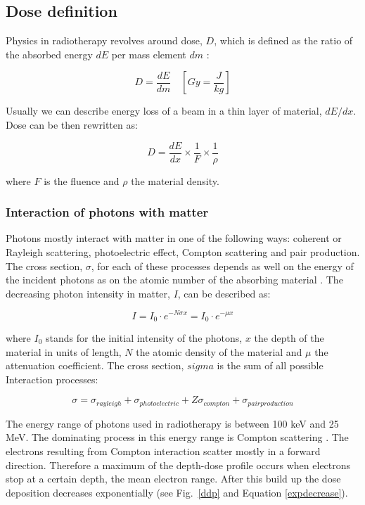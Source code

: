\documentclass[type=dr, dr=rernat, accentcolor=tud7b,colorbacktitle, bigchapter, openright, twoside, 12pt ]{tudthesis}
\begin{document}
\subsection{Dose definition}

Physics in radiotherapy revolves around dose, $D$, which is defined as the ratio of the absorbed energy $dE$ per mass element $dm$ \cite{ICRU1993}:

\begin{equation}
 D = \frac{dE}{dm} \quad \left[ Gy = \frac{J}{kg} \right]
\end{equation}

Usually we can describe energy loss of a beam in a thin layer of material, $dE/dx$. Dose can be then rewritten as:

\begin{equation}
 D = \frac{dE}{dx} \times \frac{1}{F} \times \frac{1}{\rho}
\end{equation}

where $F$ is the fluence and $\rho$ the material density.


\subsubsection{Interaction of photons with matter}

Photons mostly interact with matter in one of the following ways: coherent or Rayleigh scattering, photoelectric effect, Compton scattering and pair production. The cross section, $\sigma$, for each of these processes depends as well on the energy of the incident photons as on the atomic number of the absorbing material \cite{Lilley2006}. The decreasing photon intensity in matter, $I$, can be described as:

\begin{equation}
 I = I_{0} \cdot e^{- N \sigma x} = I_{0} \cdot e^{-\mu x}
 \label{expdecrease}
\end{equation} 

where $I_{0}$ stands for the initial intensity of the photons, $x$ the depth of the material in units of length, $N$ the atomic density of the material and $\mu$ the attenuation coefficient. The cross section, $sigma$ is the sum of all possible Interaction processes:

\begin{equation}
{\sigma} = \sigma_{rayleigh} + \sigma_{photoelectric} + Z\sigma_{compton} + \sigma_{pairproduction} 
\end{equation}

The energy range of photons used in radiotherapy is between 100 keV and 25 MeV. The dominating process in this energy range is Compton scattering \cite{Alpen1998}.
The electrons resulting from Compton interaction scatter mostly in a forward direction. Therefore a maximum of the depth-dose profile occurs when electrons stop at a certain depth, 
the mean electron range. After this build up the dose deposition decreases exponentially (see Fig.~\ref{ddp} and Equation \ref{expdecrease}).
\end{document}
